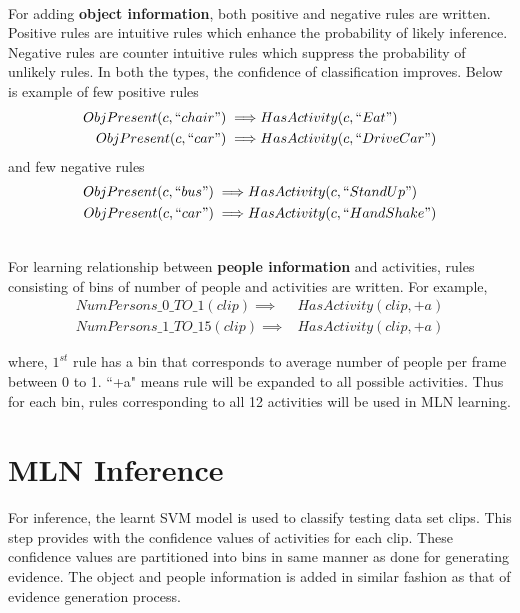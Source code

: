~ \\
For adding {\bf object information}, both positive and negative rules are written.
Positive rules are intuitive rules which enhance the probability of likely
inference. Negative rules are counter intuitive rules which suppress the
probability of unlikely rules. In both the types, the confidence of classification
improves. Below is example of few positive rules
\begin{equation}
	\begin{split}
		ObjPresent(c,``chair") \implies & HasActivity(c,``Eat") \\
		ObjPresent(c,``car") \implies & HasActivity(c,``DriveCar")
	\end{split}
\end{equation}
and few negative rules
\begin{equation}
	\begin{split}
		ObjPresent(c,``bus") \implies & HasActivity(c,``StandUp") \\
		ObjPresent(c,``car") \implies & HasActivity(c,``HandShake")
	\end{split}
\end{equation}

~ \\
For learning relationship between {\bf people information} and activities,
rules consisting of bins of number of people and activities are written.
For example,
\begin{equation}
	\begin{split}
		NumPersons\_0\_TO\_1(clip)\implies & HasActivity(clip,+a) \\
		NumPersons\_1\_TO\_15(clip)\implies & HasActivity(clip,+a)
	\end{split}
\end{equation}

where, $1^{st}$ rule has a bin that corresponds to average number of people 
per frame between 0 to 1.
``+a" means rule will be expanded to all possible activities. Thus for each bin,
rules corresponding to all 12 activities will be used in MLN learning.




\section{MLN Inference}
For inference, the learnt SVM model is used to classify testing
data set clips. This step provides with the confidence values of activities for
each clip. These confidence values are partitioned into bins in same manner
as done for generating evidence.
The object and people information is added in similar fashion as that of
evidence generation process. 

